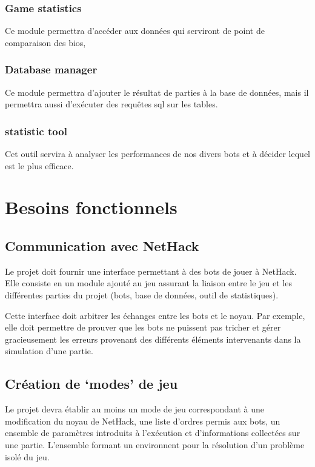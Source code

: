 \documentclass[12pt]{article}
\begin{document}
\subsubsection*{Game statistics}
Ce module permettra d'accéder aux données qui serviront de point de comparaison des bios,
\subsubsection*{Database manager}
Ce module permettra d'ajouter le résultat de parties à la base de données, mais il permettra aussi d'exécuter des requêtes sql sur les tables.
\subsubsection*{statistic tool}
Cet outil servira à analyser les performances de nos divers bots et à décider lequel est le plus efficace.


\section{Besoins fonctionnels}

\subsection{Communication avec NetHack}

Le projet doit fournir une interface permettant à des bots de jouer à NetHack. Elle consiste en un module ajouté au jeu assurant la liaison entre le jeu et les différentes parties du projet (bots, base de données, outil de statistiques).

Cette interface doit arbitrer les échanges entre les bots et le noyau. Par exemple, elle doit permettre de prouver que les bots ne puissent pas tricher et gérer gracieusement les erreurs provenant des différents éléments intervenants dans la simulation d'une partie.

\subsection{Création de `modes' de jeu}

Le projet devra établir au moins un mode de jeu correspondant à une modification du noyau de NetHack, une liste d'ordres permis aux bots, un ensemble de paramètres introduits à l'exécution et d'informations collectées sur une partie. L'ensemble formant un environnent pour la résolution d'un problème isolé du jeu.
\end{document}
